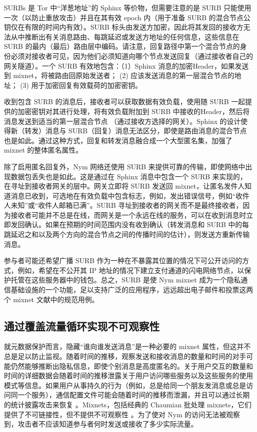 \documentclass{article}
\begin{document}
	SURBs 是 Tor 中“洋葱地址”的 Sphinx 等价物，但需要注意的是 SURB 只能使用一次（以防止重放攻击）并且在其有效 epoch 内（用于准备 SURB 的混合节点公钥仅在有限的时间内有效）。SURB 标头由发送方加密，因此将其发回的接收方无法从中推断出有关消息路由、每跳延迟或发送方地址的任何信息，这些信息在 SURB 的最内（最后）路由层中编码。请注意，回复路径中第一个混合节点的身份必须对接收者可见，因为他们必须知道向哪个节点发送回复（通过接收者自己的网关隧道）。一个 SURB 有效地包含：（1）Sphinx 消息的加密Header，如果发送到 mixnet，将被路由回原始发送者； (2) 应该发送消息的第一层混合节点的地址； (3) 用于加密回复有效载荷的加密密钥。\newline

	收到包含 SURB 的消息后，接收者可以获取数据有效负载，使用随 SURB 一起提供的加密密钥对其进行处理，将有效负载附加到 SURB 中接收的Header，然后将消息发送到适当的第一层混合节点 （通过接收方选择的网关）。Sphinx 的设计使得新（转发）消息与 SURB（回复）消息无法区分，即使是路由消息的混合节点也是如此。通过这种方式，回复和转发消息融合成一个大型匿名集，加强了 mixnet 的整体匿名属性。\newline

	除了启用匿名回复外，Nym 网络还使用 SURB 来提供可靠的传输，即使网络中出现数据包丢失也是如此。这是通过在 Sphinx 消息中包含一个 SURB 来实现的，在寻址到接收者网关的层中。网关立即将 SURB 发送回 mixnet，让匿名发件人知道消息已收到，可选地在有效负载中包含标志，例如，发出错误信号，例如“收件人未知”或“收件人邮箱已满”。SURB 寻址到接收者的网关而不是最终接收者，因为接收者可能并不总是在线，而网关是一个永远在线的服务，可以在收到消息时立即发回确认。如果在预期的时间范围内没有收到确认（转发消息和 SURB 中的每跳延迟之和以及两个方向的混合节点之间的传播时间的估计），则发送方重新传输消息。\newline

	参与者可能还希望广播 SURB 作为一种在不暴露其位置的情况下可公开访问的方式，例如，希望在不公开其 IP 地址的情况下建立支付通道的闪电网络节点，以保护托管在这些服务器中的钱包。总之，SURB 是使 Nym mixnet 成为一个隐私通信基础设施的一个功能，足以支持广泛的应用程序，远远超出电子邮件和投票这两个 mixnet 文献中的规范用例。\newline

	\subsection{通过覆盖流量循环实现不可观察性}

	就元数据保护而言，隐藏“谁向谁发送消息”是一种必要的 mixnet 属性，但这并不总是足以防止监视。随着时间的推移，观察发送和接收消息的数量和时间的对手可能仍然能够推断出隐私信息，即使个别消息是高度匿名的\cite{ref32}。关于用户交互的数量和时间的详细数据会随着时间的推移泄露关于用户访问哪些服务以及这些服务的使用模式等信息。如果用户从事持久的行为（例如，总是给同一个朋友发消息或总是访问同一个服务），通信配置文件可能会随着时间的推移而泄漏，并且可以通过长期的统计披露攻击来恢复 \cite{ref26, ref31}。Mixnets，包括经典的 Chaumian 批处理 mixnets，它们提供了不可链接性，但不提供不可观察性 \cite{ref87}。为了使对 Nym 的访问无法被观察到，攻击者不应该知道参与者何时发送或接收了多少实际流量。\newline
\end{document}
